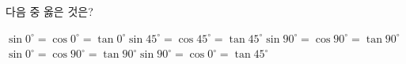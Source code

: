다음 중 옳은 것은?
\begin{choicesv}{$\sin 0^\circ=\cos 0^\circ=\tan 0^\circ$}{$\sin 45^\circ=\cos 45^\circ=\tan 45^\circ$}{$\sin 90^\circ=\cos 90^\circ=\tan 90^\circ$}{$\sin 0^\circ=\cos 90^\circ=\tan 90^\circ$}{$\sin 90^\circ=\cos 0^\circ=\tan 45^\circ$}\end{choicesv}
